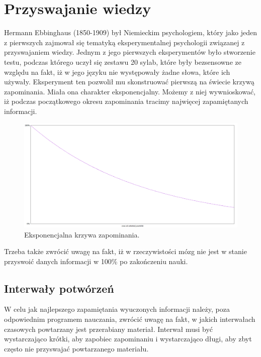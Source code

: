 {\let\cleardoublepage\relax \chapter{Przyswajanie wiedzy}}

Hermann Ebbinghaus\cite{HumanMemory} (1850-1909) był Niemieckim psychologiem, który jako jeden z pierwszych zajmował się tematyką eksperymentalnej psychologii związanej z przyswajaniem wiedzy. 
Jednym z jego pierwszych eksperymentów było stworzenie testu, podczas którego uczył się zestawu 20 sylab, które były bezsensowne ze względu na fakt, iż w jego języku nie występowały żadne słowa, które ich używały.
Eksperyment ten pozwolił mu skonstruować pierwszą na świecie krzywą zapominania. Miała ona charakter eksponencjalny.  Możemy z niej wywnioskować, iż podczas początkowego okresu zapominania tracimy najwięcej zapamiętanych informacji.

\begin{figure}[h]
	\centering
	\includegraphics[width=\textwidth]{images/curve.png}
	 \caption{Eksponencjalna krzywa zapominania.}
\end{figure}

Trzeba także zwrócić uwagę na fakt, iż w rzeczywistości\cite{ForgettingCurve} mózg nie jest w stanie przyswoić danych informacji w 100\% po zakończeniu nauki. 

\section{Interwały potwórzeń}

W celu jak najlepszego zapamiętania wyuczonych informacji należy, poza odpowiednim programem nauczania, zwrócić uwagę na fakt, w jakich interwałach czasowych powtarzany jest przerabiany materiał\cite{ForgettingCurve}.
Interwał musi być wystarczająco krótki, aby zapobiec zapominaniu i wystarczająco długi, aby zbyt często nie przyswajać powtarzanego materiału.

